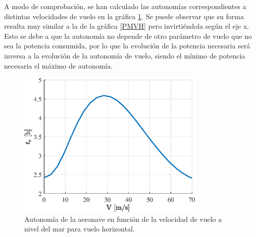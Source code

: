 A modo de comprobación, se han calculado las autonomías correspondientes a distintas velocidades de vuelo en la gráfica \ref{teVH}. Se puede observar que su forma resulta muy similar a la de la gráfica \ref{PMVH} pero invirtiéndola según el eje x. Esto se debe a que la autonomía no depende de otro parámetro de vuelo que no sea la potencia consumida, por lo que la evolución de la potencia necesaria será inversa a la evolución de la autonomía de vuelo, siendo el mínimo de potencia necesaria el máximo de autonomía.

\begin{figure}
	\centering
	\includegraphics[width=90mm]{graficos/teVH}
	\caption{Autonomía de la aeronave en función de la velocidad de vuelo a nivel del mar para vuelo horizontal.}
	\label{teVH}
\end{figure}

